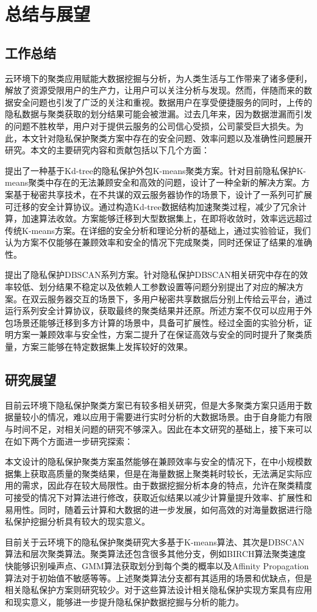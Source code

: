 \chapter{总结与展望}
\section{工作总结}
云环境下的聚类应用赋能大数据挖掘与分析，为人类生活与工作带来了诸多便利，解放了资源受限用户的生产力，让用户可以关注分析与发现。然而，伴随而来的数据安全问题也引发了广泛的关注和重视。数据用户在享受便捷服务的同时，上传的隐私数据与聚类获取的划分结果可能会被泄漏。过去几年来，因为数据泄漏而引发的问题不胜枚举，用户对于提供云服务的公司信心受损，公司蒙受巨大损失。为此，本文针对隐私保护聚类方案中存在的安全问题、效率问题以及准确性问题展开研究。本文的主要研究内容和贡献包括以下几个方面：

\begin{compactitem}
	\item 
	提出了一种基于Kd-tree的隐私保护外包K-means聚类方案。针对目前隐私保护K-means聚类中存在的无法兼顾安全和高效的问题，设计了一种全新的解决方案。方案基于秘密共享技术，在不共谋的双云服务器协作的场景下，设计了一系列可扩展可迁移的安全计算协议。通过构造Kd-tree数据结构加速聚类过程，减少了冗余计算，加速算法收敛。方案能够迁移到大型数据集上，在即将收敛时，效率远远超过传统K-means方案。在详细的安全分析和理论分析的基础上，通过实验验证，我们认为方案不仅能够在兼顾效率和安全的情况下完成聚类，同时还保证了结果的准确性。
	\item 
	提出了隐私保护DBSCAN系列方案。针对隐私保护DBSCAN相关研究中存在的效率较低、划分结果不稳定以及依赖人工参数设置等问题分别提出了对应的解决方案。在双云服务器交互的场景下，多用户秘密共享数据后分别上传给云平台，通过运行系列安全计算协议，获取最终的聚类结果并还原。所述方案不仅可以应用于外包场景还能够迁移到多方计算的场景中，具备可扩展性。经过全面的实验分析，证明方案一兼顾效率与安全性，方案二提升了在保证高效与安全的同时提升了聚类质量，方案三能够在特定数据集上发挥较好的效果。
\end{compactitem}

\section{研究展望}
目前云环境下隐私保护聚类方案已有较多相关研究，但是大多聚类方案只适用于数据量较小的情况，难以应用于需要进行实时分析的大数据场景。由于自身能力有限与时间不足，对相关问题的研究不够深入。因此在本文研究的基础上，接下来可以在如下两个方面进一步研究探索：

本文设计的隐私保护聚类方案虽然能够在兼顾效率与安全的情况下，在中小规模数据集上获取高质量的聚类结果，但是在海量数据上聚类耗时较长，无法满足实际应用的需求，因此存在较大局限性。由于数据挖掘分析本身的特点，允许在聚类精度可接受的情况下对算法进行修改，获取近似结果以减少计算量提升效率、扩展性和易用性。同时，随着云计算和大数据的进一步发展，如何高效的对海量数据进行隐私保护挖掘分析具有较大的现实意义。

目前关于云环境下的隐私保护聚类研究大多基于K-means算法、其次是DBSCAN算法和层次聚类算法。聚类算法还包含很多其他分支，例如BIRCH算法聚类速度快能够识别噪声点、GMM算法获取划分到每个类的概率以及Affinity Propagation算法对于初始值不敏感等等。上述聚类算法分支都有其适用的场景和优缺点，但是相关隐私保护方案则研究较少。对于这些算法设计相关隐私保护实现方案具有应用和现实意义，能够进一步提升隐私保护数据挖掘与分析的能力。